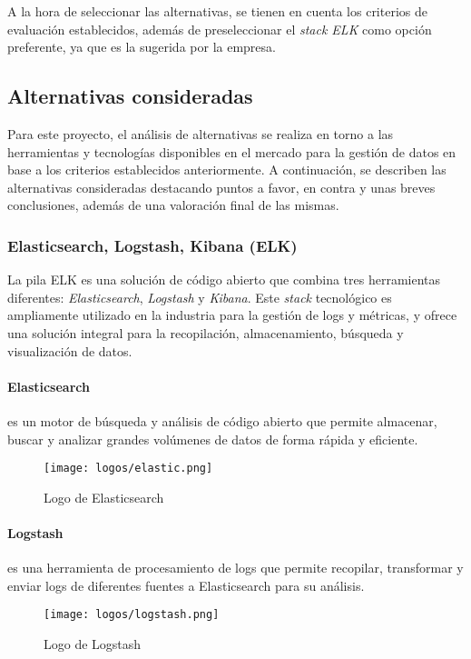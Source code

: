 A la hora de seleccionar las alternativas, se tienen en cuenta los criterios de
evaluación establecidos, además de preseleccionar el \textit{stack ELK} como
opción preferente, ya que es la sugerida por la empresa.


\subsection{Alternativas consideradas}
Para este proyecto, el análisis de alternativas se realiza en torno a las
herramientas y tecnologías disponibles en el mercado para la gestión de datos en
base a los criterios establecidos anteriormente. A continuación, se describen
las alternativas consideradas destacando puntos a favor, en contra y unas
breves conclusiones, además de una valoración final de las mismas.


\subsubsection{Elasticsearch, Logstash, Kibana (ELK)}
La pila ELK es una solución de código abierto que combina tres herramientas
diferentes: \textit{Elasticsearch}, \textit{Logstash} y \textit{Kibana}. Este
\textit{stack} tecnológico es ampliamente utilizado en la industria para la
gestión de logs y métricas, y ofrece una solución integral para la recopilación,
almacenamiento, búsqueda y visualización de datos.

\paragraph{Elasticsearch} es un motor de búsqueda y análisis de código abierto
que permite almacenar, buscar y analizar grandes volúmenes de datos de forma
rápida y eficiente.

\begin{figure}[H]
	\centering
	\texttt{[image: logos/elastic.png]}
	\caption{Logo de Elasticsearch~\textregistered}
\end{figure}

\paragraph{Logstash} es una herramienta de procesamiento de logs que permite
recopilar, transformar y enviar logs de diferentes fuentes a Elasticsearch para
su análisis.

\begin{figure}[H]
	\centering
	\texttt{[image: logos/logstash.png]}
	\caption{Logo de Logstash~\textregistered}
\end{figure}

